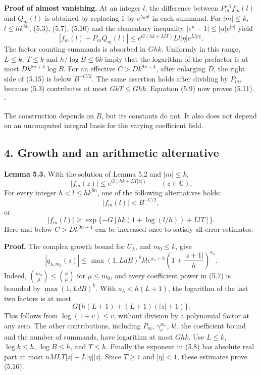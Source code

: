\documentclass[
  11pt,
  a4paper,
]{article}
\begin{document}
\textbf{Proof of almost vanishing.} At an integer \(l\), the difference
between \(P_m^{-1}f_m(l)\) and \(Q_m(l)\) is obtained by replacing \(1\)
by \(e^{\lambda_n\eta l}\) in each summand. For \(|m|\le k\),
\(l\le hk^{8n}\), (5.3), (5.7), (5.10) and the elementary inequality
\(|e^u-1|\le |u|e^{|u|}\) yield \[
|f_m(l)-P_mQ_m(l)|
\le e^{G(hk+LlT)}Ll|\eta|e^{Ll|\eta|}. \tag{5.15}
\] The factor counting summands is absorbed in \(Ghk\). Uniformly in
this range, \(L\le k,\ T\le k\) and \(h/\log B\le6k\) imply that the
logarithm of the prefactor is at most \(Dk^{8n+3}\log B\). For an
effective \(C>Dk^{9n+4}\), after enlarging \(D\), the right side of
(5.15) is below \(B^{-C/2}\). The same assertion holds after dividing by
\(P_m\), because (5.3) contributes at most \(GkT\le Ghk\). Equation
(5.9) now proves (5.11). \(\square\)

The construction depends on \(B\), but its constants do not. It also
does not depend on an uncomputed integral basis for the varying
coefficient field.

\subsection{4. Growth and an arithmetic
alternative}\label{growth-and-an-arithmetic-alternative}

\textbf{Lemma 5.3.} With the solution of Lemma 5.2 and \(|m|\le k\), \[
|f_m(z)|\le e^{G(hk+LT|z|)}\qquad(z\in\mathbb C). \tag{5.16}
\] For every integer \(h<l\le hk^{8n}\), one of the following
alternatives holds: \[
|f_m(l)|<B^{-C/2}, \tag{5.17}
\] or \[
|f_m(l)|\ge
\exp\{-G[hk(1+\log(l/h))+LlT]\}. \tag{5.18}
\] Here and below \(C>Dk^{9n+4}\) can be increased once to satisfy all
error estimates.

\textbf{Proof.} The complex growth bound for \(U_\lambda\), and
\(m_0\le k\), give \[
|q_{\lambda,m_0}(z)|
\le \max(1,LdB)^k k!e^{a_\lambda+h}
\left(1+\frac{|z+1|}{h}\right)^{a_\lambda}.
\] Indeed, \(\binom{m_0}{\mu}\le\binom{k}{\mu}\) for \(\mu\le m_0\), and
every coefficient power in (5.7) is bounded by \(\max(1,LdB)^k\). With
\(a_\lambda<h(L+1)\), the logarithm of the last two factors is at most
\[
G\{h(L+1)+(L+1)(|z|+1)\}.
\] This follows from \(\log(1+v)\le v\), without division by a
polynomial factor at any zero. The other contributions, including
\(P_m\), \(\gamma_r^{m_r}\), \(k!\), the coefficient bound and the
number of summands, have logarithm at most \(Ghk\). Use \(L\le k\),
\(\log k\le h\), \(\log B\le h\), and \(T\le h\). Finally the exponent
in (5.8) has absolute real part at most \(nMLT|z|+L|\eta||z|\). Since
\(T\ge1\) and \(|\eta|<1\), these estimates prove (5.16).
\end{document}

